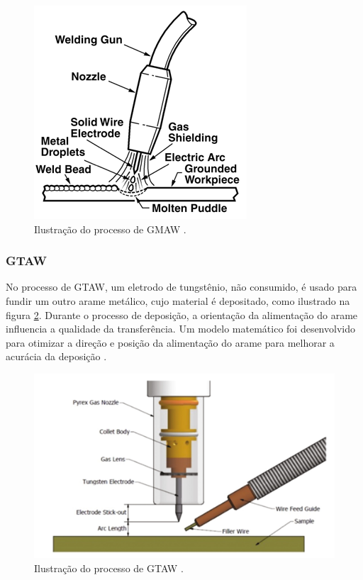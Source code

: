 \begin{figure}[hbt!]
    \centering
    \includegraphics[width=0.6\linewidth]{Imagens/chap02/gmaw_scheme.png}
    \caption{Ilustração do processo de GMAW \cite{azadi2017simultaneous}.}
    \label{fig:gmaw_scheme}
\end{figure}

\subsubsection{GTAW}
No processo de GTAW, um eletrodo de tungstênio, não consumido, é usado para fundir um outro arame metálico, cujo material é depositado, como ilustrado na figura \ref{fig:gtaw_scheme}. Durante o processo de deposição, a orientação da alimentação do arame influencia a qualidade da transferência. Um modelo matemático foi desenvolvido para otimizar a direção e posição da alimentação do arame para melhorar a acurácia da deposição \cite{geng2017optimization}.

\begin{figure}[hbt!]
    \centering
    \includegraphics[width=0.8\linewidth]{Imagens/chap02/gtaw_scheme.png}
    \caption{Ilustração do processo de GTAW \cite{hoye2015characterisation}.}
    \label{fig:gtaw_scheme}
\end{figure}

